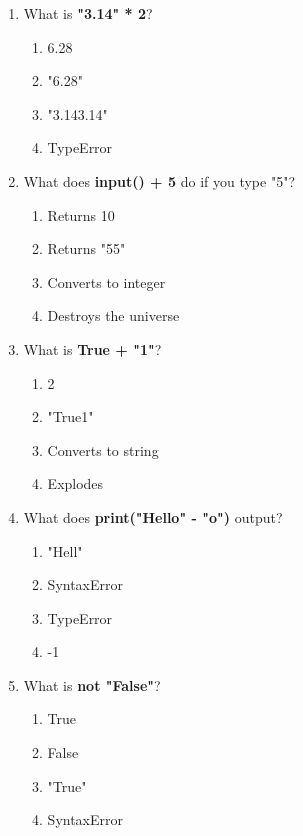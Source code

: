 \documentclass{article}
\begin{document}
\begin{multicols*}{4}
\begin{enumerate}
        \item What is \textbf{"3.14" * 2}?
        \begin{enumerate}[label=(\Alph*)]
            \item 6.28
            \item "6.28"
            \item "3.143.14"
            \item TypeError
        \end{enumerate}

        \item What does \textbf{input() + 5} do if you type "5"?
        \begin{enumerate}[label=(\Alph*)]
            \item Returns 10
            \item Returns "55"
            \item Converts to integer
            \item Destroys the universe
        \end{enumerate}

        \item What is \textbf{True + "1"}?
        \begin{enumerate}[label=(\Alph*)]
            \item 2
            \item "True1"
            \item Converts to string
            \item Explodes
        \end{enumerate}

        \item What does \textbf{print("Hello" - "o")} output?
        \begin{enumerate}[label=(\Alph*)]
            \item "Hell"
            \item SyntaxError
            \item TypeError
            \item -1
        \end{enumerate}

        \item What is \textbf{not "False"}?
        \begin{enumerate}[label=(\Alph*)]
            \item True
            \item False
            \item "True"
            \item SyntaxError
        \end{enumerate}


\end{enumerate}
\end{multicols*}
\end{document}
